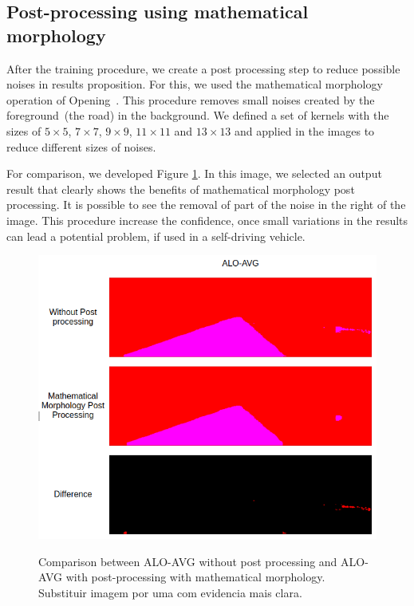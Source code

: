 \subsection{Post-processing using mathematical morphology}

After the training procedure, we create a post processing step to reduce possible noises in results proposition. For this, we used the mathematical morphology operation of Opening~\cite{najman13}. This procedure removes small noises created by the foreground~(the road) in the background. We defined a set of kernels with the sizes of $5\times5$, $7\times7$, $9\times9$, $11\times11$ and $13\times13$ and applied in the images to reduce different sizes of noises. 

For comparison, we developed Figure \ref{fig:post_processing_comp}. In this image, we selected an output result that clearly shows the benefits of mathematical morphology post processing. {\color{red}It is possible to see the removal of part of the noise in the right of the image.} This procedure increase the confidence, once small variations in the results can lead a potential problem, if used in a self-driving vehicle.

\begin{figure}
  \caption{Comparison between ALO-AVG without post processing and ALO-AVG with post-processing with mathematical morphology. {\color{red}Substituir imagem por uma com evidencia mais clara.}}
  \centering
  \includegraphics[width=0.9\columnwidth]{figures/falreis/post_processing_comparison.png}
  \label{fig:post_processing_comp}
\end{figure}

